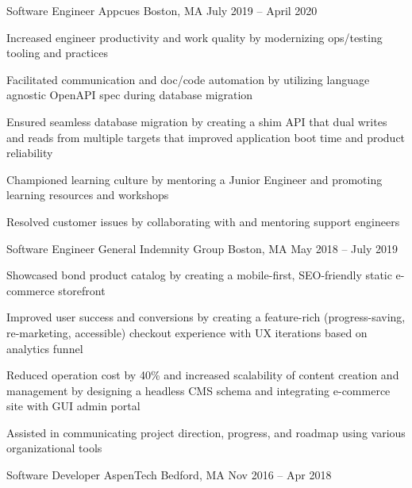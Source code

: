 \documentclass[]{awesome-cv}
\begin{document}
\begin{cventries}
	\cventry
	{Software Engineer}
	{Appcues}
	{Boston, MA}
	{July 2019 – April 2020}
	{\begin{cvitems}
		\item {Increased engineer productivity and work quality by modernizing ops/testing tooling and practices}
		\item {Facilitated communication and doc/code automation by utilizing language agnostic OpenAPI spec during database migration}
		\item {Ensured seamless database migration by creating a shim API that dual writes and reads from multiple targets that improved application boot time and product reliability}
		\item {Championed learning culture by mentoring a Junior Engineer and promoting learning resources and workshops}
		\item {Resolved customer issues by collaborating with and mentoring support engineers}
		\end{cvitems}}
	\cventry
	{Software Engineer}
	{General Indemnity Group}
	{Boston, MA}
	{May 2018 – July 2019}
	{\begin{cvitems}
		\item {Showcased bond product catalog by creating a mobile-first, SEO-friendly static e-commerce storefront}
		\item {Improved user success and conversions by creating a feature-rich (progress-saving, re-marketing, accessible) checkout experience with UX iterations based on analytics funnel}
		\item {Reduced operation cost by 40\% and increased scalability of content creation and management by designing a headless CMS schema and integrating e-commerce site with GUI admin portal}
		\item {Assisted in communicating project direction, progress, and roadmap using various organizational tools}
		\end{cvitems}}
	\cventry
	{Software Developer}
	{AspenTech}
	{Bedford, MA}
	{Nov 2016 – Apr 2018}
	{\begin{cvitems}
		\end{cvitems}}
	\vspace{-5mm}
\end{cventries}
\end{document}
